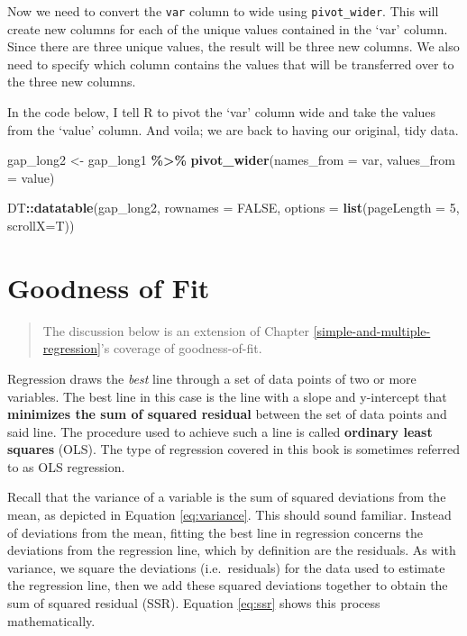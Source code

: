 \documentclass[
]{book}
\makeatletter
\newenvironment{Shaded}{\begin{snugshade}}{\end{snugshade}}
\newcommand{\AttributeTok}[1]{\textcolor[rgb]{0.27,0.27,0.27}{#1}}
\newcommand{\ConstantTok}[1]{\textcolor[rgb]{0.37,0.37,0.37}{#1}}
\newcommand{\DecValTok}[1]{\textcolor[rgb]{0.06,0.06,0.06}{#1}}
\newcommand{\FunctionTok}[1]{\textcolor[rgb]{0.27,0.27,0.27}{\textbf{#1}}}
\newcommand{\NormalTok}[1]{#1}
\newcommand{\OtherTok}[1]{\textcolor[rgb]{0.37,0.37,0.37}{#1}}
\newcommand{\SpecialCharTok}[1]{\textcolor[rgb]{0.43,0.43,0.43}{\textbf{#1}}}
\newenvironment{kframe}{%
\medskip{}
\setlength{\fboxsep}{.8em}
 \def\at@end@of@kframe{}%
 \ifinner\ifhmode%
  \def\at@end@of@kframe{\end{minipage}}%
  \begin{minipage}{\columnwidth}%
 \fi\fi%
 \def\FrameCommand##1{\hskip\@totalleftmargin \hskip-\fboxsep
 \colorbox{shadecolor}{##1}\hskip-\fboxsep
     \hskip-\linewidth \hskip-\@totalleftmargin \hskip\columnwidth}%
 \MakeFramed {\advance\hsize-\width
   \@totalleftmargin\z@ \linewidth\hsize
   \@setminipage}}%
 {\par\unskip\endMakeFramed%
 \at@end@of@kframe}
\renewenvironment{Shaded}{\begin{kframe}}{\end{kframe}}
\makeatother
\begin{document}
Now we need to convert the \texttt{var} column to wide using \texttt{pivot\_wider}. This will create new columns for each of the unique values contained in the `var' column. Since there are three unique values, the result will be three new columns. We also need to specify which column contains the values that will be transferred over to the three new columns.

In the code below, I tell R to pivot the `var' column wide and take the values from the `value' column. And voila; we are back to having our original, tidy data.

\begin{Shaded}
\begin{Highlighting}[]
\NormalTok{gap\_long2 }\OtherTok{\textless{}{-}}\NormalTok{ gap\_long1 }\SpecialCharTok{\%\textgreater{}\%} 
  \FunctionTok{pivot\_wider}\NormalTok{(}\AttributeTok{names\_from =}\NormalTok{ var,}
              \AttributeTok{values\_from =}\NormalTok{ value)}

\NormalTok{DT}\SpecialCharTok{::}\FunctionTok{datatable}\NormalTok{(gap\_long2, }\AttributeTok{rownames =} \ConstantTok{FALSE}\NormalTok{, }\AttributeTok{options =} \FunctionTok{list}\NormalTok{(}\AttributeTok{pageLength =} \DecValTok{5}\NormalTok{, }\AttributeTok{scrollX=}\NormalTok{T))}
\end{Highlighting}
\end{Shaded}

\hypertarget{appendixC}{%
\chapter{Goodness of Fit}\label{appendixC}}

\begin{quote}
The discussion below is an extension of Chapter \ref{simple-and-multiple-regression}'s coverage of goodness-of-fit.
\end{quote}

Regression draws the \emph{best} line through a set of data points of two or more variables. The best line in this case is the line with a slope and y-intercept that \textbf{minimizes the sum of squared residual} between the set of data points and said line. The procedure used to achieve such a line is called \textbf{ordinary least squares} (OLS). The type of regression covered in this book is sometimes referred to as OLS regression.

Recall that the variance of a variable is the sum of squared deviations from the mean, as depicted in Equation \eqref{eq:variance}. This should sound familiar. Instead of deviations from the mean, fitting the best line in regression concerns the deviations from the regression line, which by definition are the residuals. As with variance, we square the deviations (i.e.~residuals) for the data used to estimate the regression line, then we add these squared deviations together to obtain the sum of squared residual (SSR). Equation \eqref{eq:ssr} shows this process mathematically.
\end{document}
